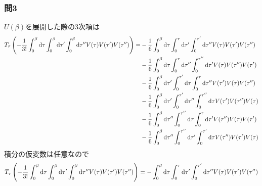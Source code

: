 \documentclass[uplatex,a4j,11pt,dvipdfmx]{jsarticle}
\begin{document}
\subsubsection*{問3}
$U(\beta)$を展開した際の3次項は
\begin{align}
  \begin{split}
    T_\tau\left(-\frac{1}{3!}\int_0^\beta{\rm d}\tau\int_0^\beta{\rm d}\tau'\int_0^\beta{\rm d}\tau''V(\tau)V(\tau')V(\tau'')\right)
    =&-\frac{1}{6}\int_0^\beta{\rm d}\tau\int_0^\tau{\rm d}\tau'\int_0^{\tau'}{\rm d}\tau''V(\tau)V(\tau')V(\tau'')\\
    &-\frac{1}{6}\int_0^\beta{\rm d}\tau\int_0^\tau{\rm d}\tau''\int_0^{\tau''}{\rm d}\tau'V(\tau)V(\tau'')V(\tau')\\
    &-\frac{1}{6}\int_0^\beta{\rm d}\tau'\int_0^{\tau'}{\rm d}\tau\int_0^{\tau}{\rm d}\tau''V(\tau')V(\tau)V(\tau'')\\
    &-\frac{1}{6}\int_0^\beta{\rm d}\tau'\int_0^{\tau'}{\rm d}\tau''\int_0^{\tau''}{\rm d}\tau V(\tau')V(\tau'')V(\tau)\\
    &-\frac{1}{6}\int_0^\beta{\rm d}\tau''\int_0^{\tau''}{\rm d}\tau\int_0^{\tau}{\rm d}\tau' V(\tau'')V(\tau)V(\tau')\\
    &-\frac{1}{6}\int_0^\beta{\rm d}\tau''\int_0^{\tau''}{\rm d}\tau'\int_0^{\tau'}{\rm d}\tau V(\tau'')V(\tau')V(\tau)
  \end{split}
\end{align}
積分の仮変数は任意なので
\begin{align}
  T_\tau\left(-\frac{1}{3!}\int_0^\beta{\rm d}\tau\int_0^\beta{\rm d}\tau'\int_0^\beta{\rm d}\tau''V(\tau)V(\tau')V(\tau'')\right)
  =-\int_0^\beta{\rm d}\tau\int_0^\tau{\rm d}\tau'\int_0^{\tau'}{\rm d}\tau''V(\tau)V(\tau')V(\tau'')
\end{align}
\end{document}
